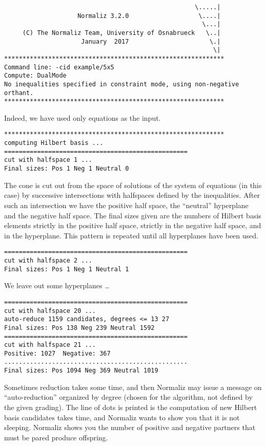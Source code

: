 \documentclass[12pt,a4paper]{scrartcl}
\theoremstyle{definition}
\begin{document}
\begin{Verbatim}
                                                    \.....|
                    Normaliz 3.2.0                   \....|
                                                      \...|
     (C) The Normaliz Team, University of Osnabrueck   \..|
                     January  2017                      \.|
                                                         \|
************************************************************
Command line: -cid example/5x5 
Compute: DualMode 
No inequalities specified in constraint mode, using non-negative orthant.
************************************************************
\end{Verbatim}
Indeed, we have used only equations as the input.
\begin{Verbatim}
************************************************************
computing Hilbert basis ...
==================================================
cut with halfspace 1 ...
Final sizes: Pos 1 Neg 1 Neutral 0
\end{Verbatim}
The cone is cut out from the space of solutions of the system of equations (in this case) by successive intersections with halfspaces defined by the inequalities. After such an intersection we have the positive half space, the ``neutral'' hyperplane and the negative half space. The final sizes given are the numbers of Hilbert basis elements strictly in the positive half space, strictly in the negative half space, and in the hyperplane. This pattern is repeated until all hyperplanes have been used.
\begin{Verbatim}
==================================================
cut with halfspace 2 ...
Final sizes: Pos 1 Neg 1 Neutral 1
\end{Verbatim}
We leave out some hyperplanes \dots
\begin{Verbatim}
==================================================
cut with halfspace 20 ...
auto-reduce 1159 candidates, degrees <= 13 27 
Final sizes: Pos 138 Neg 239 Neutral 1592
==================================================
cut with halfspace 21 ...
Positive: 1027  Negative: 367
..................................................
Final sizes: Pos 1094 Neg 369 Neutral 1019
\end{Verbatim}
Sometimes reduction takes some time, and then Normaliz may issue a message on ``auto-reduction'' organized by degree (chosen for the algorithm, not defined by the given grading). The line of dots is printed is the computation of new Hilbert basis candidates takes time, and Normaliz wants to show you that it is not sleeping. Normaliz shows you the number of positive and negative partners that must be pared produce offspring.
\end{document}
